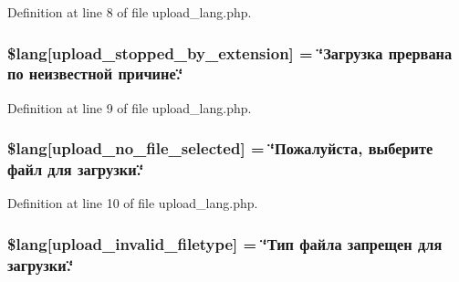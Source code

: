 Definition at line 8 of file upload\+\_\+lang.\+php.

\subsubsection[{\texorpdfstring{\$lang}{$lang}}]{\setlength{\rightskip}{0pt plus 5cm}\$lang\mbox{[}\textquotesingle{}upload\+\_\+stopped\+\_\+by\+\_\+extension\textquotesingle{}\mbox{]} = \char`\"{}Загрузка прервана по неизвестной причине.\char`\"{}}\hypertarget{application_2language_2russian_2upload__lang_8php_ae97257deea3dddb33be4bbc6510a464b}{}\label{application_2language_2russian_2upload__lang_8php_ae97257deea3dddb33be4bbc6510a464b}


Definition at line 9 of file upload\+\_\+lang.\+php.

\subsubsection[{\texorpdfstring{\$lang}{$lang}}]{\setlength{\rightskip}{0pt plus 5cm}\$lang\mbox{[}\textquotesingle{}upload\+\_\+no\+\_\+file\+\_\+selected\textquotesingle{}\mbox{]} = \char`\"{}Пожалуйста, выберите файл для загрузки.\char`\"{}}\hypertarget{application_2language_2russian_2upload__lang_8php_a88d8e8f9b879d1c25e6c089f3d3b5a30}{}\label{application_2language_2russian_2upload__lang_8php_a88d8e8f9b879d1c25e6c089f3d3b5a30}


Definition at line 10 of file upload\+\_\+lang.\+php.

\subsubsection[{\texorpdfstring{\$lang}{$lang}}]{\setlength{\rightskip}{0pt plus 5cm}\$lang\mbox{[}\textquotesingle{}upload\+\_\+invalid\+\_\+filetype\textquotesingle{}\mbox{]} = \char`\"{}Тип файла запрещен для загрузки.\char`\"{}}\hypertarget{application_2language_2russian_2upload__lang_8php_ac8631aa85ed80396bd78e91a76d5fd38}{}\label{application_2language_2russian_2upload__lang_8php_ac8631aa85ed80396bd78e91a76d5fd38}


